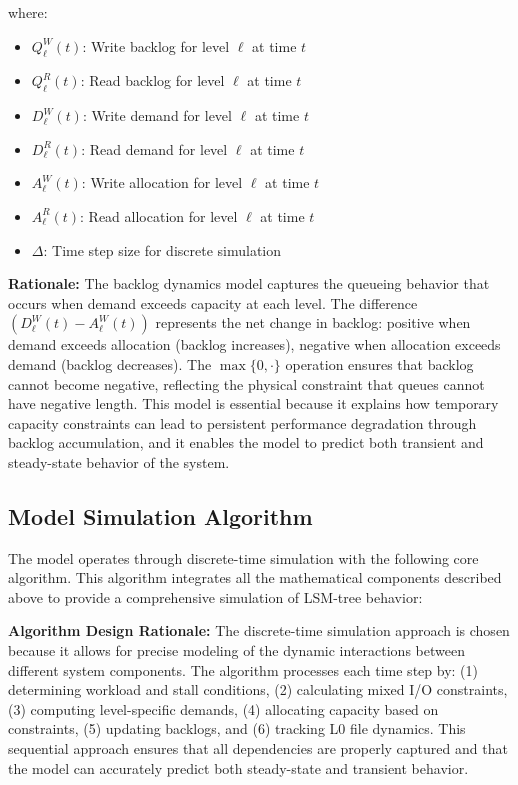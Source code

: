 \documentclass[11pt]{article}
\begin{document}
where:
\begin{itemize}
    \item $Q^W_\ell(t)$: Write backlog for level $\ell$ at time $t$
    \item $Q^R_\ell(t)$: Read backlog for level $\ell$ at time $t$
    \item $D^W_\ell(t)$: Write demand for level $\ell$ at time $t$
    \item $D^R_\ell(t)$: Read demand for level $\ell$ at time $t$
    \item $A^W_\ell(t)$: Write allocation for level $\ell$ at time $t$
    \item $A^R_\ell(t)$: Read allocation for level $\ell$ at time $t$
    \item $\Delta$: Time step size for discrete simulation
\end{itemize}

\textbf{Rationale:} The backlog dynamics model captures the queueing behavior that occurs when demand exceeds capacity at each level. The difference $(D^W_\ell(t) - A^W_\ell(t))$ represents the net change in backlog: positive when demand exceeds allocation (backlog increases), negative when allocation exceeds demand (backlog decreases). The $\max\{0, \cdot\}$ operation ensures that backlog cannot become negative, reflecting the physical constraint that queues cannot have negative length. This model is essential because it explains how temporary capacity constraints can lead to persistent performance degradation through backlog accumulation, and it enables the model to predict both transient and steady-state behavior of the system.

\subsection{Model Simulation Algorithm}

The model operates through discrete-time simulation with the following core algorithm. This algorithm integrates all the mathematical components described above to provide a comprehensive simulation of LSM-tree behavior:

\textbf{Algorithm Design Rationale:} The discrete-time simulation approach is chosen because it allows for precise modeling of the dynamic interactions between different system components. The algorithm processes each time step by: (1) determining workload and stall conditions, (2) calculating mixed I/O constraints, (3) computing level-specific demands, (4) allocating capacity based on constraints, (5) updating backlogs, and (6) tracking L0 file dynamics. This sequential approach ensures that all dependencies are properly captured and that the model can accurately predict both steady-state and transient behavior.
\end{document}
